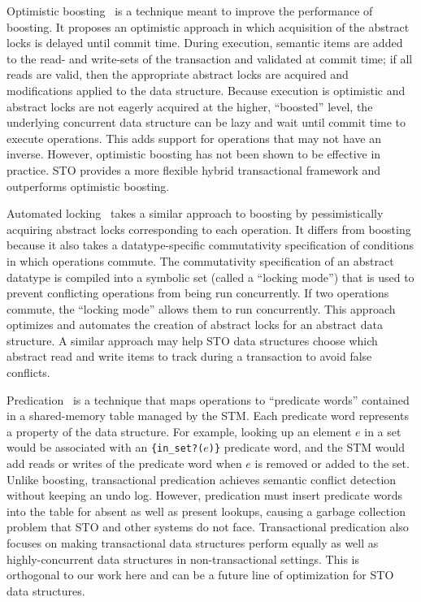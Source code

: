 Optimistic boosting~\cite{optboost} is a technique meant to improve the performance of boosting. It proposes an optimistic approach in which acquisition of the abstract locks is delayed until commit time. During execution, semantic items are added to the read- and write-sets of the transaction and validated at commit time; if all reads are valid, then the appropriate abstract locks are acquired and modifications applied to the data structure. Because execution is optimistic and abstract locks are not eagerly acquired at the higher, ``boosted'' level, the underlying concurrent data structure can be lazy and wait until commit time to execute operations. This adds support for operations that may not have an inverse. 
However, optimistic boosting has not been shown to be effective in practice. STO provides a more flexible hybrid transactional framework and outperforms optimistic boosting.

Automated locking~\cite{autolock} takes a similar approach to boosting by pessimistically acquiring abstract locks corresponding to each operation. It differs from boosting because it also takes a datatype-specific commutativity specification of conditions in which operations commute. The commutativity specification of an abstract datatype is compiled into a symbolic set (called a ``locking mode'') that is used to prevent conflicting operations from being run concurrently. If two operations commute, the ``locking mode'' allows them to run concurrently.
This approach optimizes and automates the creation of abstract locks for an abstract data structure. A similar approach may help STO data structures choose which abstract read and write items to track during a transaction to avoid false conflicts.

Predication~\cite{predication} is a technique that maps operations to ``predicate words'' contained in a shared-memory table managed by the STM. Each predicate word represents a property of the data structure. For example, looking up an element $e$ in a set would be associated with an \texttt{\{in\_set?($e$)\}} predicate word, and the STM would add reads or writes of the predicate word when $e$ is removed or added to the set. 
Unlike boosting, transactional predication achieves semantic conflict detection without keeping an undo log. However, predication must insert predicate words into the table for absent as well as present lookups, causing a garbage collection problem that STO and other systems do not face. Transactional predication also focuses on making transactional data structures perform equally as well as highly-concurrent data structures in non-transactional settings. This is orthogonal to our work here and can be a future line of optimization for STO data structures.

